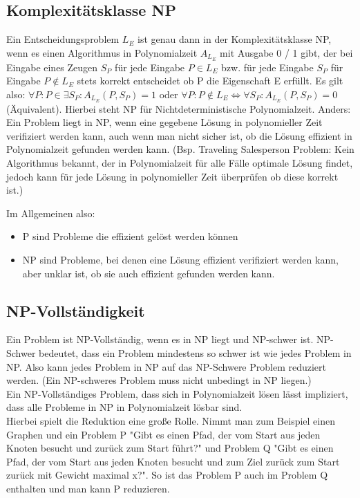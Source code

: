 \documentclass[
../../AuD-Zusammenfassung.tex,
]
{subfiles}
\begin{document}
\subsection{Komplexitätsklasse NP}
Ein Entscheidungsproblem $L_E$ ist genau dann in der Komplexitätsklasse NP, wenn es einen Algorithmus in Polynomialzeit $A_{L_E}$ mit Ausgabe 0 / 1 gibt, der bei Eingabe eines Zeugen $S_P$ für jede Eingabe $P \in L_E$ bzw. für jede Eingabe $S_P$ für Eingabe $P \notin L_E$ stets korrekt entscheidet ob P die Eigenschaft E erfüllt. Es gilt also: $\forall P: P \in \exists S_P: A_{L_E}(P, S_P) = 1 $ oder $\forall P: P \notin L_E \Leftrightarrow \forall S_P: A_{L_E}(P, S_P) = 0$ (Äquivalent).
Hierbei steht NP für Nichtdeterministische Polynomialzeit.
Anders: Ein Problem liegt in NP, wenn eine gegebene Lösung in polynomieller Zeit verifiziert werden kann, auch wenn man nicht sicher ist, ob die Lösung effizient in Polynomialzeit gefunden werden kann. (Bsp. Traveling Salesperson Problem: Kein Algorithmus bekannt, der in Polynomialzeit für alle Fälle optimale Lösung findet, jedoch kann für jede Lösung in polynomieller Zeit überprüfen ob diese korrekt ist.)

Im Allgemeinen also:
\begin{itemize}
    \item P sind Probleme die effizient gelöst werden können
    \item NP sind Probleme, bei denen eine Lösung effizient verifiziert werden kann, aber unklar ist, ob sie auch effizient gefunden werden kann.
\end{itemize}

\subsection{NP-Vollständigkeit}
Ein Problem ist NP-Vollständig, wenn es in NP liegt und NP-schwer ist. NP-Schwer bedeutet, dass ein Problem mindestens so schwer ist wie jedes Problem in NP. Also kann jedes Problem in NP auf das NP-Schwere Problem reduziert werden. (Ein NP-schweres Problem muss nicht unbedingt in NP liegen.)\\
Ein NP-Vollständiges Problem, dass sich in Polynomialzeit lösen lässt impliziert, dass alle Probleme in NP in Polynomialzeit lösbar sind.\\

Hierbei spielt die Reduktion eine große Rolle. Nimmt man zum Beispiel einen Graphen und ein Problem P "Gibt es einen Pfad, der vom Start aus jeden Knoten besucht und zurück zum Start führt?" und Problem Q "Gibt es einen Pfad, der vom Start aus jeden Knoten besucht und zum Ziel zurück zum Start zurück mit Gewicht maximal x?". So ist das Problem P auch im Problem Q enthalten und man kann P reduzieren.

\end{document}
